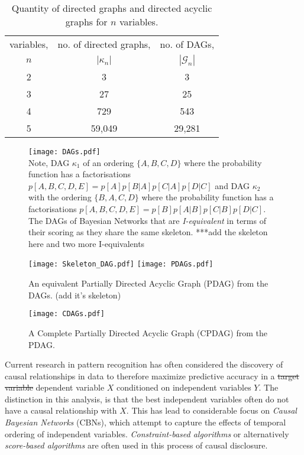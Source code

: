 \documentclass[7pt]{article}
\begin{document}
\begin{table}
\begin{center}
\begin{tabular}{ccc}
	\toprule
	variables, & no. of directed graphs,  & no. of DAGs,  \\
	$n$  & $|\mathcal{\kappa}_n|$ &  $|\mathcal{G}_n|$  \\
	\toprule
	2 & 3 & 3    					\\
	3 & 27 & 25   				  \\
    4 & 729 & 543  				\\
    5 & 59,049 & 29,281 	 \\
    \toprule

\end{tabular}
\caption{Quantity of directed graphs and directed acyclic graphs for $n$ variables.}
 \label{DAGS1}
\end{center}
\end{table}
\begin{figure}
	\centering
	\texttt{[image: DAGs.pdf]} \\
		\caption{Note, DAG $\mathcal{\kappa}_1$ of an ordering $\{A, B, C, D\}$ where the probability function has a factorisations $p[A,B,C,D,E] = p[A]p[B|A]p[C|A]p[D|C]$ and DAG $\mathcal{\kappa}_2$  with the ordering $\{B,A,C,D \}$ where the probability function has a  factorisations $p[A,B,C,D,E] = p[B]p[A|B]p[C|B]p[D|C]$. The DAGs of Bayesian Networks that are \emph{I-equivalent} in terms of their scoring as they share the same skeleton. ***add the skeleton here and two more I-equivalents }
		\label{DAGs}
				\texttt{[image: Skeleton\_DAG.pdf]} 
	\texttt{[image: PDAGs.pdf]} 
		\caption{An equivalent Partially Directed Acyclic Graph (PDAG) from the DAGs. (add it's skeleton)}
	\label{PDAGs}
	\texttt{[image: CDAGs.pdf]}
	\caption{A Complete Partially Directed Acyclic Graph (CPDAG) from the PDAG.}
	\label{CPDAGs}
\end{figure}


Current research in pattern recognition has often considered the discovery of causal relationships in data to therefore maximize predictive accuracy in a \st{target variable} dependent variable $X$ conditioned on independent variables $Y$. The distinction in this analysis, is that the best independent variables often do not have a causal relationship with $X$. This has lead to considerable focus on \emph{Causal Bayesian Networks} (CBNs), which attempt to capture the effects of temporal ordering of independent variables. \emph{Constraint-based algorithms} or alternatively \emph{score-based algorithms} are often used in this process of causal disclosure.  
\end{document}
